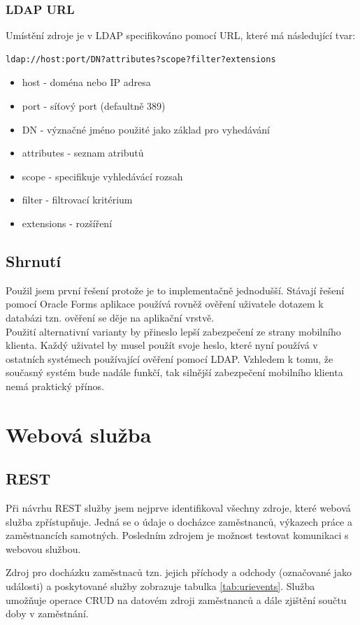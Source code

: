 \documentclass{bakalarka}
\begin{document}
\subsection*{LDAP URL}
Umístění zdroje je v LDAP specifikováno pomocí URL, které má následující tvar:
\begin{verbatim}
ldap://host:port/DN?attributes?scope?filter?extensions
\end{verbatim}
\begin{itemize}[noitemsep,nolistsep]
\item host - doména nebo IP adresa
\item port - síťový port (defaultně 389)
\item DN - význačné jméno použité jako základ pro vyhedávání
\item attributes -  seznam atributů
\item scope - specifikuje vyhledávácí rozsah  
\item filter - filtrovací kritérium
\item extensions - rozšíření
\end{itemize}

\section{Shrnutí}
Použil jsem první řešení protože je to implementačně jednodušší. Stávají řešení pomocí Oracle Forms aplikace používá rovněž ověření uživatele dotazem k databázi tzn. ověření se děje na aplikační vrstvě. \\ \indent
Použití alternativní varianty by přineslo lepší zabezpečení ze strany mobilního klienta. Každý uživatel by musel použít svoje heslo, které nyní používá v ostatních systémech používající ověření pomocí LDAP. Vzhledem k tomu, že současný systém bude nadále funkčí, tak silnější zabezpečení mobilního klienta nemá praktický přínos.

\chapter{Webová služba}

\section{REST}
Při návrhu REST služby jsem nejprve identifikoval všechny zdroje, které webová služba zpřístupňuje. Jedná se o údaje o docházce zaměstnanců, výkazech práce a zaměstnancích samotných. Posledním zdrojem je možnost testovat komunikaci s webovou službou. \par
Zdroj pro docházku zaměstnaců tzn. jejich příchody a odchody (označované jako události) a poskytované služby zobrazuje tabulka \ref{tab:urievents}. Služba umožňuje operace CRUD na datovém zdroji zaměstnanců a dále zjištění součtu doby v zaměstnání.
\end{document}
